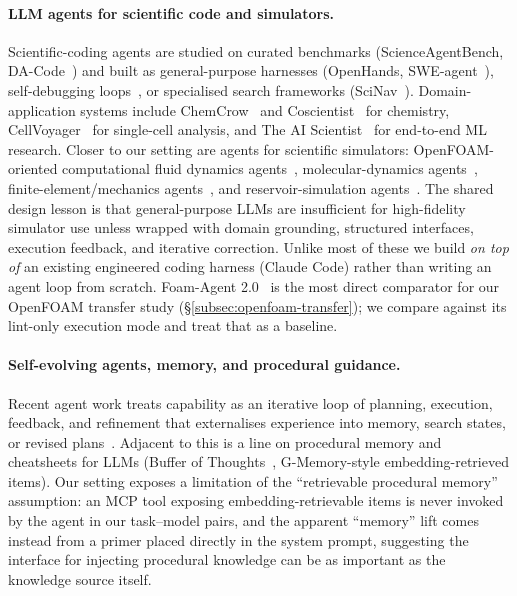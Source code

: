 \documentclass{article}
\begin{document}
\paragraph{LLM agents for scientific code and simulators.}
Scientific-coding agents are studied on curated benchmarks (ScienceAgentBench, DA-Code~\cite{chen2025scienceagentbench,huang2024dacode}) and built as general-purpose harnesses (OpenHands, SWE-agent~\cite{wang2024openhands,yang2024sweagent}), self-debugging loops~\cite{chen2024selfdebug}, or specialised search frameworks (SciNav~\cite{zhang2026scinav}). Domain-application systems include ChemCrow~\cite{bran2024chemcrow} and Coscientist~\cite{boiko2023coscientist} for chemistry, CellVoyager~\cite{alber2025cellvoyager} for single-cell analysis, and The AI Scientist~\cite{lu2024aiscientist,yamada2025ai} for end-to-end ML research. Closer to our setting are agents for scientific simulators: OpenFOAM-oriented computational fluid dynamics agents~\cite{chen2024metaopenfoam,pandey2025openfoamgpt,foamagent2025}, molecular-dynamics agents~\cite{kim2024mdagents,shi2026mdagent2,guilbert2025dynamate,zhao2026polyjarvis}, finite-element/mechanics agents~\cite{zhan2025mooseagent,ni2024mechagents}, and reservoir-simulation agents~\cite{moyner2026jutulgpt}. The shared design lesson is that general-purpose LLMs are insufficient for high-fidelity simulator use unless wrapped with domain grounding, structured interfaces, execution feedback, and iterative correction. Unlike most of these we build \emph{on top of} an existing engineered coding harness (Claude Code) rather than writing an agent loop from scratch. Foam-Agent 2.0~\cite{foamagent2025} is the most direct comparator for our OpenFOAM transfer study (\S\ref{subsec:openfoam-transfer}); we compare against its lint-only execution mode and treat that as a baseline.

\paragraph{Self-evolving agents, memory, and procedural guidance.}
Recent agent work treats capability as an iterative loop of planning, execution, feedback, and refinement that externalises experience into memory, search states, or revised plans~\citep{bran2024chemcrow,boiko2023coscientist,alber2025cellvoyager,lu2024aiscientist,zhang2026scinav,li2026agentflow,tang2026eigenagent,narayanan2024aviary}. Adjacent to this is a line on procedural memory and cheatsheets for LLMs (Buffer of Thoughts~\cite{yang2024bot}, G-Memory-style embedding-retrieved items). Our setting exposes a limitation of the ``retrievable procedural memory'' assumption: an MCP tool exposing embedding-retrievable items is never invoked by the agent in our task--model pairs, and the apparent ``memory'' lift comes instead from a primer placed directly in the system prompt, suggesting the interface for injecting procedural knowledge can be as important as the knowledge source itself.
\end{document}
